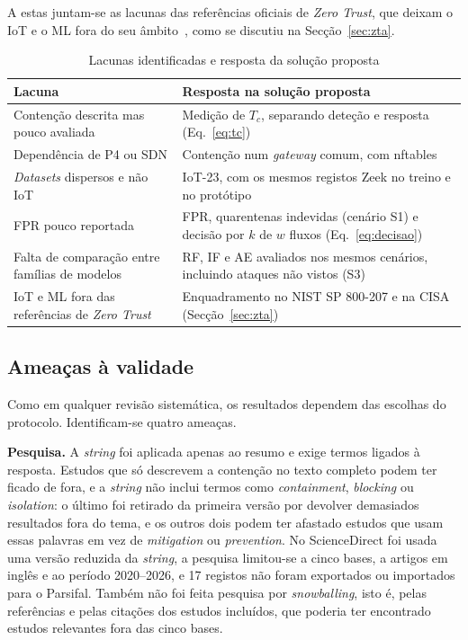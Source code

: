 \documentclass[conference,a4paper]{IEEEtran}
\begin{document}
A estas juntam-se as lacunas das referências oficiais de \textit{Zero Trust}, que
deixam o IoT e o ML fora do seu âmbito~\cite{nccoe2025zta,cisa2023ztmm}, como se discutiu
na Secção~\ref{sec:zta}.

\begin{table}[H]
\caption{Lacunas identificadas e resposta da solução proposta}\label{tab:lacunas}
\centering\footnotesize
\begin{tabular}{@{}>{\raggedright\arraybackslash}p{}>{\raggedright\arraybackslash}p{}@{}}
\toprule
Lacuna & Resposta na solução proposta \\
\midrule
Contenção descrita mas pouco avaliada & Medição de $T_c$, separando deteção e resposta (Eq.~\ref{eq:tc}) \\
Dependência de P4 ou SDN & Contenção num \textit{gateway} comum, com nftables \\
\textit{Datasets} dispersos e não IoT & IoT-23, com os mesmos registos Zeek no treino e no protótipo \\
FPR pouco reportada & FPR, quarentenas indevidas (cenário S1) e decisão por $k$ de $w$ fluxos (Eq.~\ref{eq:decisao}) \\
Falta de comparação entre famílias de modelos & RF, IF e AE avaliados nos mesmos cenários, incluindo ataques não vistos (S3) \\
IoT e ML fora das referências de \textit{Zero Trust} & Enquadramento no NIST SP 800-207 e na CISA (Secção~\ref{sec:zta}) \\
\bottomrule
\end{tabular}
\end{table}

\subsection{Ameaças à validade}
Como em qualquer revisão sistemática, os resultados dependem das escolhas do
protocolo. Identificam-se quatro ameaças.

\textbf{Pesquisa.} A \textit{string} foi aplicada apenas ao resumo e exige termos ligados
à resposta. Estudos que só descrevem a contenção no texto completo podem ter ficado de
fora, e a \textit{string} não inclui termos como \textit{containment},
\textit{blocking} ou \textit{isolation}: o último foi retirado da primeira versão por
devolver demasiados resultados fora do tema, e os outros dois podem ter afastado estudos
que usam essas palavras em vez de \textit{mitigation} ou \textit{prevention}. No
ScienceDirect foi usada uma versão reduzida da \textit{string}, a pesquisa limitou-se a
cinco bases, a artigos em inglês e ao período 2020--2026, e 17 registos não foram
exportados ou importados para o Parsifal. Também não foi feita pesquisa por
\textit{snowballing}, isto é, pelas referências e pelas citações dos estudos incluídos,
que poderia ter encontrado estudos relevantes fora das cinco bases.
\end{document}
